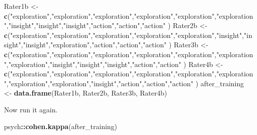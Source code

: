 \documentclass[
  english,
]{book}
\newenvironment{Shaded}{\begin{snugshade}}{\end{snugshade}}
\newcommand{\KeywordTok}[1]{\textcolor[rgb]{0.13,0.29,0.53}{\textbf{#1}}}
\newcommand{\NormalTok}[1]{#1}
\newcommand{\OperatorTok}[1]{\textcolor[rgb]{0.81,0.36,0.00}{\textbf{#1}}}
\newcommand{\StringTok}[1]{\textcolor[rgb]{0.31,0.60,0.02}{#1}}
\begin{document}
\begin{Shaded}
\begin{Highlighting}[]
\NormalTok{Rater1b <-}\StringTok{ }\KeywordTok{c}\NormalTok{(}\StringTok{"exploration"}\NormalTok{,}\StringTok{"exploration"}\NormalTok{,}\StringTok{"exploration"}\NormalTok{,}\StringTok{"exploration"}\NormalTok{,}\StringTok{"exploration"}\NormalTok{,}\StringTok{"exploration"}\NormalTok{,}\StringTok{"insight"}\NormalTok{,}\StringTok{"insight"}\NormalTok{,}\StringTok{"insight"}\NormalTok{,}\StringTok{"action"}\NormalTok{,}\StringTok{"action"}\NormalTok{,}\StringTok{"action"}\NormalTok{ )}
\NormalTok{Rater2b <-}\StringTok{ }\KeywordTok{c}\NormalTok{(}\StringTok{"exploration"}\NormalTok{,}\StringTok{"exploration"}\NormalTok{,}\StringTok{"exploration"}\NormalTok{,}\StringTok{"exploration"}\NormalTok{,}\StringTok{"exploration"}\NormalTok{,}\StringTok{"insight"}\NormalTok{,}\StringTok{"insight"}\NormalTok{,}\StringTok{"insight"}\NormalTok{,}\StringTok{"exploration"}\NormalTok{,}\StringTok{"action"}\NormalTok{,}\StringTok{"action"}\NormalTok{,}\StringTok{"action"}\NormalTok{ )}
\NormalTok{Rater3b <-}\StringTok{ }\KeywordTok{c}\NormalTok{(}\StringTok{"exploration"}\NormalTok{,}\StringTok{"exploration"}\NormalTok{,}\StringTok{"exploration"}\NormalTok{,}\StringTok{"exploration"}\NormalTok{,}\StringTok{"exploration"}\NormalTok{,}\StringTok{"exploration"}\NormalTok{,}\StringTok{"exploration"}\NormalTok{,}\StringTok{"insight"}\NormalTok{,}\StringTok{"insight"}\NormalTok{,}\StringTok{"insight"}\NormalTok{,}\StringTok{"action"}\NormalTok{,}\StringTok{"action"}\NormalTok{ )}
\NormalTok{Rater4b <-}\StringTok{ }\KeywordTok{c}\NormalTok{(}\StringTok{"exploration"}\NormalTok{,}\StringTok{"exploration"}\NormalTok{,}\StringTok{"exploration"}\NormalTok{,}\StringTok{"exploration"}\NormalTok{,}\StringTok{"exploration"}\NormalTok{,}\StringTok{"exploration"}\NormalTok{,}\StringTok{"exploration"}\NormalTok{,}\StringTok{"exploration"}\NormalTok{,}\StringTok{"insight"}\NormalTok{,}\StringTok{"action"}\NormalTok{,}\StringTok{"action"}\NormalTok{,}\StringTok{"action"}\NormalTok{ )}
\NormalTok{after_training <-}\StringTok{ }\KeywordTok{data.frame}\NormalTok{(Rater1b, Rater2b, Rater3b, Rater4b)}
\end{Highlighting}
\end{Shaded}

Now run it again.

\begin{Shaded}
\begin{Highlighting}[]
\NormalTok{psych}\OperatorTok{::}\KeywordTok{cohen.kappa}\NormalTok{(after_training)}
\end{Highlighting}
\end{Shaded}
\end{document}
